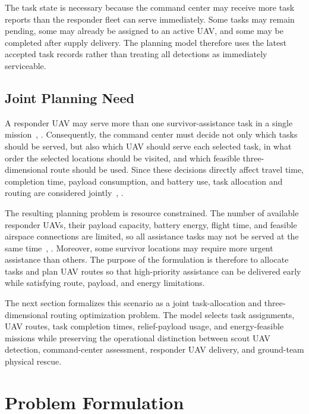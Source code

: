 \documentclass[conference]{IEEEtran}
\begin{document}
The task state is necessary because the command center may receive more task reports than the responder fleet can serve immediately. Some tasks may remain pending, some may already be assigned to an active UAV, and some may be completed after supply delivery. The planning model therefore uses the latest accepted task records rather than treating all detections as immediately serviceable.

\subsection{Joint Planning Need}

A responder UAV may serve more than one survivor-assistance task in a single mission~\cite{ref_multipackage_uav}, \cite{ref_delivery_survey}. Consequently, the command center must decide not only which tasks should be served, but also which UAV should serve each selected task, in what order the selected locations should be visited, and which feasible three-dimensional route should be used. Since these decisions directly affect travel time, completion time, payload consumption, and battery use, task allocation and routing are considered jointly~\cite{ref_drone_vrp}, \cite{ref_delivery_survey}.

The resulting planning problem is resource constrained. The number of available responder UAVs, their payload capacity, battery energy, flight time, and feasible airspace connections are limited, so all assistance tasks may not be served at the same time~\cite{ref_delivery_survey}, \cite{ref_drone_vrp}. Moreover, some survivor locations may require more urgent assistance than others. The purpose of the formulation is therefore to allocate tasks and plan UAV routes so that high-priority assistance can be delivered early while satisfying route, payload, and energy limitations.

The next section formalizes this scenario as a joint task-allocation and three-dimensional routing optimization problem. The model selects task assignments, UAV routes, task completion times, relief-payload usage, and energy-feasible missions while preserving the operational distinction between scout UAV detection, command-center assessment, responder UAV delivery, and ground-team physical rescue.

\section{Problem Formulation}
\end{document}

